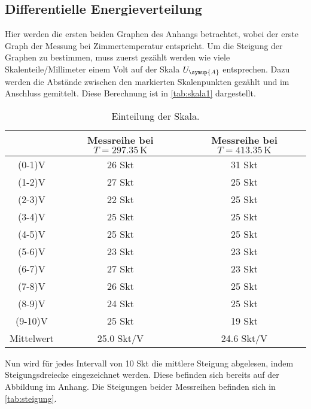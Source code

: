 \subsection{Differentielle Energieverteilung}
Hier werden die ersten beiden Graphen des Anhangs betrachtet, wobei der erste Graph der Messung bei Zimmertemperatur entspricht. Um die Steigung der 
Graphen zu bestimmen, muss zuerst gezählt werden wie viele Skalenteile/Millimeter einem Volt auf der Skala $U_{\symup{A}}$ entsprechen. Dazu werden 
die Abstände zwischen den markierten Skalenpunkten gezählt und im Anschluss gemittelt. Diese Berechnung ist in \autoref{tab:skala1} dargestellt.
\begin{table}
    \centering
    \caption{Einteilung der Skala.}
\begin{tabular}{c c c}
    \toprule
         & Messreihe bei $T=297.35\,\unit{\kelvin}$ & Messreihe bei $T=413.35\,\unit{\kelvin}$ \\
    \midrule
    (0-1)V & 26 Skt & 31 Skt \\
    (1-2)V & 27 Skt & 25 Skt \\
    (2-3)V & 22 Skt & 25 Skt \\
    (3-4)V & 25 Skt & 25 Skt \\
    (4-5)V & 25 Skt & 25 Skt\\
    (5-6)V & 23 Skt &  23 Skt \\
    (6-7)V & 27 Skt & 23 Skt \\
    (7-8)V & 26 Skt & 25 Skt \\
    (8-9)V & 24 Skt & 25 Skt \\
    (9-10)V & 25 Skt & 19 Skt \\
    \midrule
    Mittelwert & 25.0 Skt/V & 24.6 Skt/V \\
     \bottomrule
    \end{tabular}
    \label{tab: temp}
\end{table}

Nun wird für jedes Intervall von 10 Skt die mittlere Steigung abgelesen, indem Steigungsdreiecke eingezeichnet werden. Diese befinden sich bereits auf der 
Abbildung im Anhang. Die Steigungen beider Messreihen befinden sich in \autoref{tab:steigung}.

